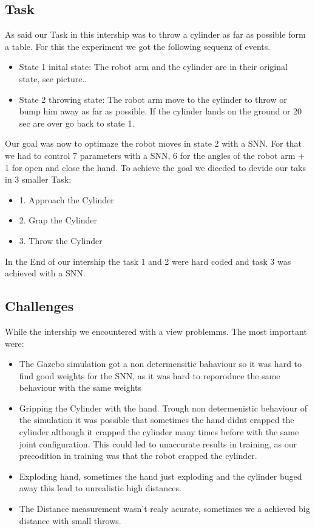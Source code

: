 \subsection{Task}
As said our Task in this intership was to throw a cylinder as far as possible form a table. For this the experiment we got the following sequenz of events.
 \begin{itemize}
\item State 1 inital state: The robot arm and the cylinder are in their original state, see picture..
\item State 2 throwing state: The robot arm move to the cylinder to throw or bump him away as far as possible. If the cylinder lands on the ground or 20 sec are over go back to state 1.
\end{itemize}
Our goal was now to optimaze the robot moves in state 2 with a SNN. For that we had to control 7 parameters with a SNN, 6 for the angles of the robot arm + 1 for open and close the hand. 
To achieve the goal we diceded to devide our taks in 3 smaller Task:
 \begin{itemize}
\item 1. Approach the Cylinder
\item 2. Grap the Cylinder
\item 3. Throw the Cylinder
\end{itemize}
In the End of our intership the task 1 and 2 were hard coded and task 3 was achieved with a SNN.
\subsection{Challenges}
While the intership we encountered with a view problemms. The most important were:
 \begin{itemize}
\item The Gazebo simulation got a non determensitic bahaviour so it was hard to find good weights for the SNN, as it was hard to reporoduce the same behaviour with the same weights
\item Gripping the Cylinder with the hand. Trough non determenistic behaviour of the simulation it was possible that sometimes the hand didnt crapped the cylinder although it crapped the cylinder many times before with the same joint configuration. This could led to unaccurate results in training, as our precodition in training was that the robot crapped the cylinder.
\item Exploding hand, sometimes the hand just exploding and the cylinder buged away this lead to unrealistic high distances.
\item The Distance measurement wasn't realy acurate, sometimes we a achieved big distance with small throws.
\end{itemize}


